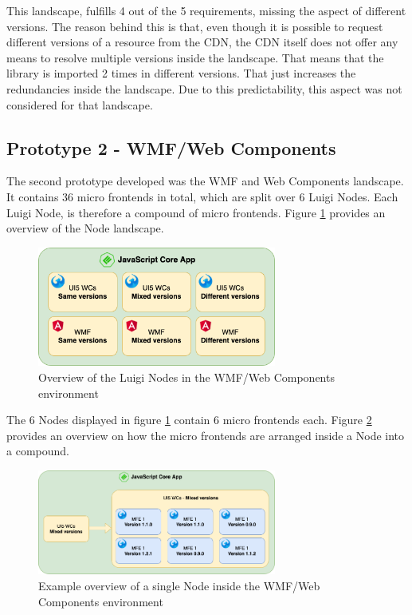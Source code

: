This landscape, fulfills 4 out of the 5 requirements, missing the aspect of different versions. The reason behind this is that, even though it is possible to request different versions of a resource from the CDN, the CDN itself does not offer any means to resolve multiple versions inside the landscape. That means that the library is imported 2 times in different versions. That just increases the redundancies inside the landscape. Due to this predictability, this aspect was not considered for that landscape.

\subsection{Prototype 2 - WMF/Web Components}

The second prototype developed was the WMF and Web Components landscape. It contains 36 micro frontends in total, which are split over 6 Luigi Nodes.
Each Luigi Node, is therefore a compound of micro frontends.
Figure \ref{fig:compound_prototype_architecture} provides an overview of the Node landscape.

\begin{figure}[!h]
	\centering
	\includegraphics[width=0.7\textwidth]{Figures/compound_views_overview.drawio.png}
	\caption{Overview of the Luigi Nodes in the WMF/Web Components environment}
	\label{fig:compound_prototype_architecture}
\end{figure}

The 6 Nodes displayed in figure \ref{fig:compound_prototype_architecture} contain 6 micro frontends each. 
Figure \ref{fig:compound_wmf_single_node} provides an overview on how the micro frontends are arranged inside a Node into a compound. 

\begin{figure}[!h]
	\centering
	\includegraphics[width=0.7\textwidth]{Figures/compound_wmf_single_node.drawio.png}
	\caption{Example overview of a single Node inside the WMF/Web Components environment}
	\label{fig:compound_wmf_single_node}
\end{figure}

